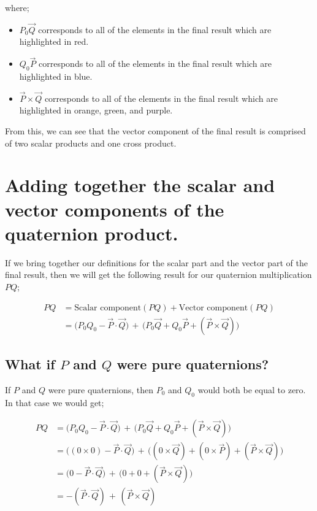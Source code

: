 where;

\begin{itemize}
    \item \(P_0\vec{Q}\) corresponds to all of the elements in the final result which are highlighted in red.
    \item \(Q_0\vec{P}\) corresponds to all of the elements in the final result which are highlighted in blue.
    \item \(\vec{P}\times\vec{Q}\) corresponds to all of the elements in the final result which are highlighted in
                              orange, green, and purple.
\end{itemize}

From this, we can see that the vector component of the final result is comprised of two scalar products and one cross
product.

\section{Adding together the scalar and vector components of the quaternion product.}

If we bring together our definitions for the scalar part and the vector part of the final result, then we will get
the following result for our quaternion multiplication \(PQ\);

\begin{align*}
PQ &= \text{Scalar component}(PQ) + \text{Vector component}(PQ)  \\
   &= \bigr(P_{0}Q_{0} - \vec{P} \cdot \vec{Q}\bigr) \, + \, \bigr(P_0\vec{Q} + Q_0\vec{P} + (\vec{P}\times\vec{Q})\bigr)
\end{align*}


\subsection{What if \(P\) and \(Q\) were pure quaternions?}

If \(P\) and \(Q\) were pure quaternions, then \(P_0\) and \(Q_0\) would both be equal to zero. In that case we would
get;

\begin{align*}
PQ & = \bigl(P_{0}Q_{0} - \vec{P} \cdot \vec{Q}\bigr) \, + \, \bigr(P_0\vec{Q} + Q_0\vec{P} + (\vec{P}\times\vec{Q})\bigr)  \\
   & = \bigl((0 \times 0) - \vec{P} \cdot \vec{Q}\bigr) \, + \, \bigr((0 \times \vec{Q}) + (0 \times \vec{P}) + (\vec{P} \times \vec{Q})\bigr)  \\
   & = \bigl(0 - \vec{P} \cdot \vec{Q}\bigr) \, + \, \bigr(0 + 0 + (\vec{P}\times\vec{Q})\bigr)  \\
   & = -(\vec{P} \cdot \vec{Q}) \, + \, (\vec{P} \times \vec{Q})
\end{align*}

